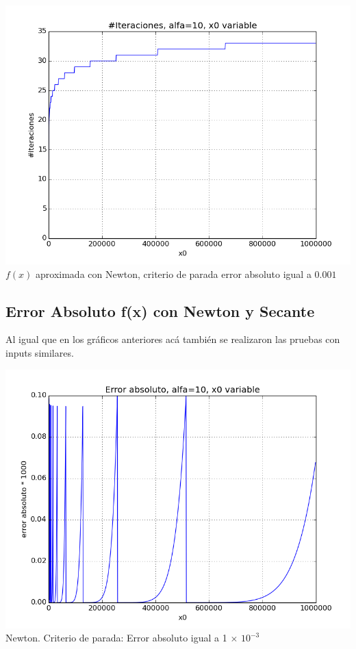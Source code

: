 \begin{center}
\includegraphics[scale=0.5]{graficos/iteraciones-f-secante-alfa_fijo-absoluto-0.001-alejando.png}\\
$f(x)$ aproximada con Newton, criterio de parada error absoluto igual a $0.001$
\end{center}

\subsection{Error Absoluto f(x) con Newton y Secante}
Al igual que en los gráficos anteriores acá también se realizaron las pruebas con inputs similares.\\

\begin{center}
\includegraphics[scale=0.5]{graficos/x0s-f-newton-alfa_fijo-absoluto-0.001-alejando.png}\\
Newton. Criterio de parada: Error absoluto igual a 1 $\times$ $10^{-3}$
\end{center}

